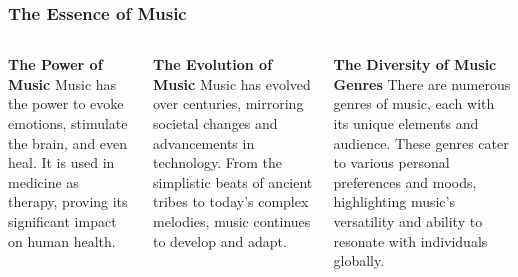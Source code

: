\documentclass[5pt]{beamer}
\begin{document}
\begin{frame}
\frametitle{The Essence of Music}
\begin{columns}
\begin{column}{0.3\textwidth}
\begin{block}{\textbf{The Power of Music}}
Music has the power to evoke emotions, stimulate the brain, and even heal. It is used in medicine as therapy, proving its significant impact on human health.
\end{block}
\end{column}
\begin{column}{0.3\textwidth}
\begin{block}{\textbf{The Evolution of Music}}
Music has evolved over centuries, mirroring societal changes and advancements in technology. From the simplistic beats of ancient tribes to today's complex melodies, music continues to develop and adapt.
\end{block}
\end{column}
\begin{column}{0.3\textwidth}
\begin{block}{\textbf{The Diversity of Music Genres}}
There are numerous genres of music, each with its unique elements and audience. These genres cater to various personal preferences and moods, highlighting music's versatility and ability to resonate with individuals globally.
\end{block}
\end{column}
\end{columns}
\end{frame}
\end{document}
